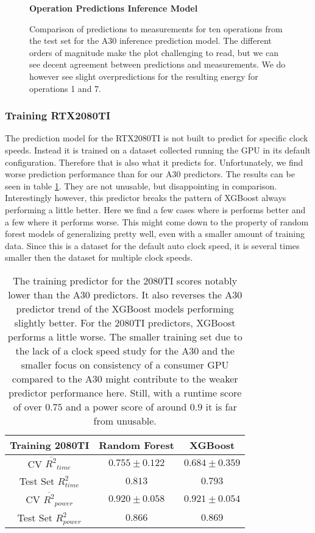 \begin{figure}[htbp]
    \centering
    \parbox{1.1\textwidth}{\centering\textbf{Operation Predictions Inference Model}}
    \caption{Comparison of predictions to measurements for ten operations from the test set for the A30 inference prediction model. The different orders of magnitude make the plot challenging to read, but we can see decent agreement between predictions and measurements. We do however see slight overpredictions for the resulting energy for operations 1 and 7.}
    \label{fig:testsetops_inf}
\end{figure}


\subsubsection{Training RTX2080TI}

The prediction model for the RTX2080TI is not built to predict for specific clock speeds. Instead it is trained on a dataset collected running the GPU in its default configuration. Therefore that is also what it predicts for. Unfortunately, we find worse prediction performance than for our A30 predictors. The results can be seen in table \ref{tab:pred_res_2080}. They are not unusable, but disappointing in comparison. Interestingly however, this predictor breaks the pattern of XGBoost always performing a little better. Here we find a few cases where is performs better and a few where it performs worse. This might come down to the property of random forest models of generalizing pretty well, even with a smaller amount of training data. Since this is a dataset for the default auto clock speed, it is several times smaller then the dataset for multiple clock speeds. 

\begin{table}[h!]
\centering
\begin{tabular}{|c|c|c|}
\hline
 \textbf{Training 2080TI}& \textbf{Random Forest} & \textbf{XGBoost} \\
\hline
CV $\overline{R^2}_{time}$ & $0.755 \pm 0.122$ &  $0.684 \pm 0.359$ \\
\hline
Test Set $R^2_{time}$ & $0.813$ & $0.793$ \\
\hline
CV $\overline{R^2}_{power}$ & $0.920 \pm 0.058$  &  $0.921 \pm 0.054$\\
\hline
Test Set $R^2_{power}$ & $0.866$ & $0.869$ \\
\hline
\end{tabular}
\caption{The training predictor for the 2080TI scores notably lower than the A30 predictors. It also reverses the A30 predictor trend of the XGBoost models performing slightly better. For the 2080TI predictors, XGBoost performs a little worse. The smaller training set due to the lack of a clock speed study for the A30 and the smaller focus on consistency of a consumer GPU compared to the A30 might contribute to the weaker predictor performance here. Still, with a runtime score of over $0.75$ and a power score of around $0.9$ it is far from unusable.}
\label{tab:pred_res_2080}
\end{table}

